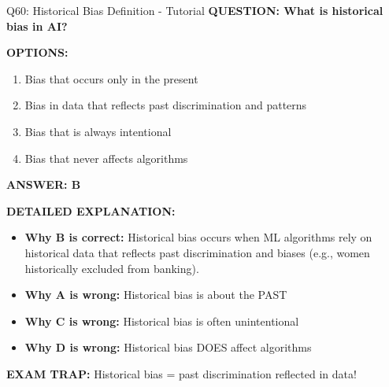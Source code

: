 \documentclass[8pt]{beamer}
\begin{document}
	\begin{frame}{Q60: Historical Bias Definition - Tutorial}
		\fontsize{6.5}{7.5}\selectfont
		\textbf{QUESTION: What is historical bias in AI?}
		
		\vspace{0.1cm}
		\textbf{OPTIONS:}
		\begin{enumerate}
			\item Bias that occurs only in the present
			\item Bias in data that reflects past discrimination and patterns
			\item Bias that is always intentional
			\item Bias that never affects algorithms
		\end{enumerate}
		
		\vspace{0.1cm}
		\textcolor{myblue}{\textbf{ANSWER: B}}
		
		\vspace{0.1cm}
		\textbf{DETAILED EXPLANATION:}
		\begin{itemize}
			\item \textbf{Why B is correct:} Historical bias occurs when ML algorithms rely on historical data that reflects past discrimination and biases (e.g., women historically excluded from banking).
			\item \textbf{Why A is wrong:} Historical bias is about the PAST
			\item \textbf{Why C is wrong:} Historical bias is often unintentional
			\item \textbf{Why D is wrong:} Historical bias DOES affect algorithms
		\end{itemize}
		
		\textcolor{myred}{\textbf{EXAM TRAP:}} Historical bias = \textcolor{myblue}{past discrimination reflected in data}!
	\end{frame}
	
\end{document}
